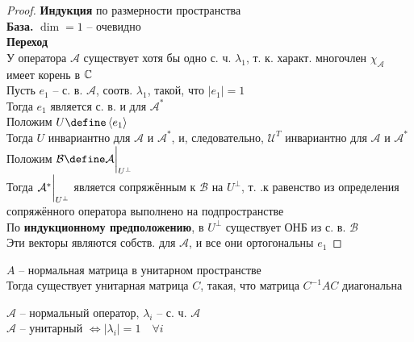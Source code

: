 \begin{proof}
	\textbf{Индукция} по размерности пространства \\
	\textbf{База.} $ \dim = 1 $ -- очевидно \\
	\textbf{Переход} \\
	У оператора $ \mathcal{A} $ существует хотя бы одно с. ч. $ \lambda_1 $, т. к. характ. многочлен $ \chi_{\mathcal{A}} $ имеет корень в $ \mathbb{C} $ \\
	Пусть $ e_1 $ -- с. в. $ \mathcal{A} $, соотв. $ \lambda_1 $, такой, что $ |e_1| = 1 $ \\
	Тогда $ e_1 $ является с. в. и для $ \mathcal{A}^* $ \\
	Положим $ U \define \braket{e_1} $ \\
	Тогда $ U $ инвариантно для $ \mathcal{A} $ и $ \mathcal{A}^* $, и, следовательно, $ \mathcal{U}^T $ инвариантно для $ \mathcal{A} $ и $ \mathcal{A}^* $ \\
	Положим $ \mathcal{B} \define \mathcal{A}\clamp{U^\perp} $ \\
	Тогда $ \mathcal{A}^*\bigg|_{U^\perp}^{} $ является сопряжённым к $ \mathcal{B} $ на $ U^\perp $, т. .к равенство из определения сопряжённого оператора выполнено на подпространстве \\
	По \textbf{индукционному предположению}, в $ U^\perp $ существует ОНБ из с. в. $ \mathcal{B} $ \\
	Эти векторы являются собств. для $ \mathcal{A} $, и все они ортогональны $ e_1 $
\end{proof}

\begin{implication}
	$ A $ -- нормальная матрица в унитарном пространстве \\
	Тогда существует унитарная матрица $ C $, такая, что матрица $ C^{-1}AC $ диагональна
\end{implication}

\begin{implication}
	$ \mathcal{A} $ -- нормальный оператор, $ \lambda_i $ -- с. ч. $ \mathcal{A} $ \\
	$ \mathcal{A} $ -- унитарный $ \iff |\lambda_i| = 1 \quad \forall i $
\end{implication}
